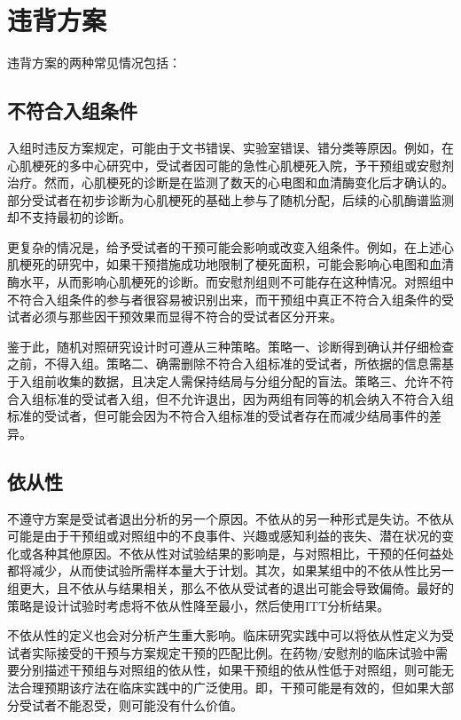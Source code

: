 \documentclass[
  chinese-hans,
  letterpaper,
  DIV=11,
  numbers=noendperiod]{scrreprt}
\begin{document}
\section{违背方案}\label{ux8fddux80ccux65b9ux6848}

违背方案的两种常见情况包括：

\subsection{不符合入组条件}\label{ux4e0dux7b26ux5408ux5165ux7ec4ux6761ux4ef6}

入组时违反方案规定，可能由于文书错误、实验室错误、错分类等原因。例如，在心肌梗死的多中心研究中，受试者因可能的急性心肌梗死入院，予干预组或安慰剂治疗。然而，心肌梗死的诊断是在监测了数天的心电图和血清酶变化后才确认的。部分受试者在初步诊断为心肌梗死的基础上参与了随机分配，后续的心肌酶谱监测却不支持最初的诊断。

更复杂的情况是，给予受试者的干预可能会影响或改变入组条件。例如，在上述心肌梗死的研究中，如果干预措施成功地限制了梗死面积，可能会影响心电图和血清酶水平，从而影响心肌梗死的诊断。而安慰剂组则不可能存在这种情况。对照组中不符合入组条件的参与者很容易被识别出来，而干预组中真正不符合入组条件的受试者必须与那些因干预效果而显得不符合的受试者区分开来。

鉴于此，随机对照研究设计时可遵从三种策略。策略一、诊断得到确认并仔细检查之前，不得入组。策略二、确需删除不符合入组标准的受试者，所依据的信息需基于入组前收集的数据，且决定人需保持结局与分组分配的盲法。策略三、允许不符合入组标准的受试者入组，但不允许退出，因为两组有同等的机会纳入不符合入组标准的受试者，但可能会因为不符合入组标准的受试者存在而减少结局事件的差异。

\subsection{依从性}\label{ux4f9dux4eceux6027}

不遵守方案是受试者退出分析的另一个原因。不依从的另一种形式是失访。不依从可能是由于干预组或对照组中的不良事件、兴趣或感知利益的丧失、潜在状况的变化或各种其他原因。不依从性对试验结果的影响是，与对照相比，干预的任何益处都将减少，从而使试验所需样本量大于计划。其次，如果某组中的不依从性比另一组更大，且不依从与结果相关，那么不依从受试者的退出可能会导致偏倚。最好的策略是设计试验时考虑将不依从性降至最小，然后使用ITT分析结果。

不依从性的定义也会对分析产生重大影响。临床研究实践中可以将依从性定义为受试者实际接受的干预与方案规定干预的匹配比例。在药物/安慰剂的临床试验中需要分别描述干预组与对照组的依从性，如果干预组的依从性低于对照组，则可能无法合理预期该疗法在临床实践中的广泛使用。即，干预可能是有效的，但如果大部分受试者不能忍受，则可能没有什么价值。
\end{document}
